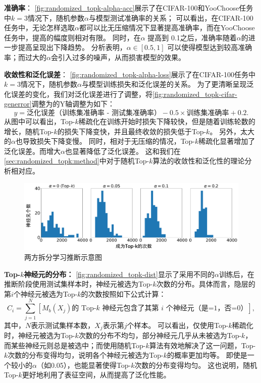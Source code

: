 \textbf{准确率}：
\autoref{fig:randomized_topk-alpha-acc}展示了在CIFAR-100和YooChoose任务中$k=3$情况下，随机参数$\alpha$与模型测试准确率的关系；
可以看出，在CIFAR-100任务中，无论怎样选取$\alpha$都可以比无压缩情况下显著提高准确率，而在YooChoose任务中，提高的幅度则相对有限。
同时，在$\alpha$ 提高到 0.1之后，准确率随着$\alpha$的进一步提高呈现出下降趋势。
%
分析表明，$\alpha \in [0.5, 1]$ 可以使得模型达到较高准确率；而过大的$\alpha$会引入过多的噪声，从而损害模型的效果。


\textbf{收敛性和泛化误差}：
\autoref{fig:randomized_topk-alpha-loss}展示了在CIFAR-100任务中$k=3$情况下，随机参数$\alpha$与模型训练损失和泛化误差的关系。
为了更清晰呈现泛化误差的变化，我们对泛化误差进行了调整，将\autoref{fig:randomized_topk-cifar-generror}调整为的Y轴调整为如下：
\begin{equation}
    y = \text{泛化误差（训练集准确率 - 测试集准确率）} - 0.5 \times \text{训练集准确率} + 0.2.
\end{equation}
%
从图中可以看出，Top-$k$稀疏化在训练开始时损失下降较快，但是随着训练轮数的增长，随机Top-$k$的损失下降变快，并且最终收敛的损失低于Top-$k$。
另外，太大的$\alpha$也导致损失下降变慢。
%
同时，相对于无压缩的情况，Top-$k$稀疏化显著增加了泛化误差。而增大$\alpha$也显著降低了泛化误差。
%
这和我们在\autoref{sec:randomized_topk:method}中对于随机Top-$k$算法的收敛性和泛化性的理论分析相对应。



\begin{figure}[h!]
    \centering
    \includegraphics[width=\linewidth]{Z_Resources/随机topk_cifar100-dist-topk.pdf}
    \caption{两方拆分学习推断示意图}
    \label{fig:randomized_topk-dist}
\end{figure}

\textbf{Top-$k$神经元的分布：}
\autoref{fig:randomized_topk-dist}显示了采用不同的$\alpha$训练后，在推断阶段使用测试集样本时，神经元被选为Top-$k$次数的分布。具体而言，隐层的第$i$个神经元被选为Top-$k$的次数按照如下公式计算：
\begin{equation}
    C_i = \sum_{j=1}^N [\text{$M_b(X_j)$的 Top-$k$ 神经元包含了其第 $i$ 个神经元（是=1，否=0）}],
\end{equation}
其中，$N$表示测试集样本数，$X_j$表示第$j$个样本。
%
%
可以看出，仅使用Top-$k$稀疏化时，神经元被选为Top-$k$次数的分布不均匀，部分神经元几乎从未被选为Top-$k$，而某些神经元则总是被选中；而使用随机Top-$k$算法有效地解决了这一问题，Top-$k$次数的分布变得均匀，说明各个神经元被选为Top-$k$的概率更加均等。
%
即使是一个较小的$\alpha$（如0.05），也能显著使得Top-$k$次数的分布变得均匀。
%
这也说明，随机Top-$k$更好地利用了表征空间，从而提高了泛化性能。
%


